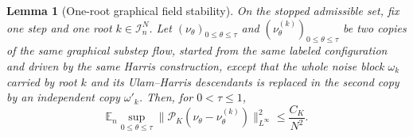 \documentclass[a4paper,fleqn]{cas-sc}
\newtheorem{lemma}[theorem]{Lemma}
\theoremstyle{definition}
\theoremstyle{remark}
\begin{document}
\begin{lemma}[One-root graphical field stability]\label{lem:one-root-field}
On the stopped admissible set, fix one step and one root $k\in\mathcal I^N_n$. Let
$(\nu_\theta)_{0\le\theta\le\tau}$ and $(\nu^{(k)}_\theta)_{0\le\theta\le\tau}$ be two copies of the
same graphical substep flow, started from the same labeled configuration and driven by the same
Harris construction, except that the whole noise block $\omega_k$ carried by root $k$ and its
Ulam--Harris descendants is replaced in the second copy by an independent copy $\omega'_k$. Then,
for $0<\tau\le1$,
\begin{equation}\label{eq:one-root-field-stability}
\mathbb E_n\sup_{0\le\theta\le\tau}\bigl\|\mathcal P_K(\nu_\theta-\nu^{(k)}_\theta)\bigr\|_{L^\infty}^2
\le\frac{C_K}{N^2}.
\end{equation}
\end{lemma}
\end{document}
